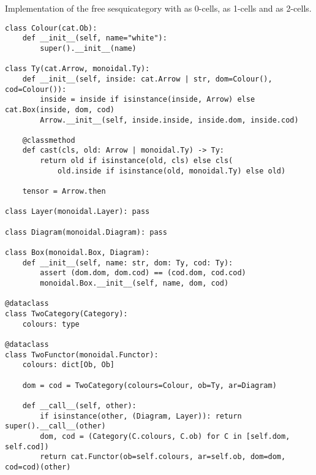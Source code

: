 \begin{python}\label{listing:free-sesquicategory}
{\normalfont Implementation of the free sesquicategory with  as 0-cells,  as 1-cells and  as 2-cells.}

\begin{verbatim}
class Colour(cat.Ob):
    def __init__(self, name="white"):
        super().__init__(name)

class Ty(cat.Arrow, monoidal.Ty):
    def __init__(self, inside: cat.Arrow | str, dom=Colour(), cod=Colour()):
        inside = inside if isinstance(inside, Arrow) else cat.Box(inside, dom, cod)
        Arrow.__init__(self, inside.inside, inside.dom, inside.cod)

    @classmethod
    def cast(cls, old: Arrow | monoidal.Ty) -> Ty:
        return old if isinstance(old, cls) else cls(
            old.inside if isinstance(old, monoidal.Ty) else old)

    tensor = Arrow.then

class Layer(monoidal.Layer): pass

class Diagram(monoidal.Diagram): pass

class Box(monoidal.Box, Diagram):
    def __init__(self, name: str, dom: Ty, cod: Ty):
        assert (dom.dom, dom.cod) == (cod.dom, cod.cod)
        monoidal.Box.__init__(self, name, dom, cod)

@dataclass
class TwoCategory(Category):
    colours: type

@dataclass
class TwoFunctor(monoidal.Functor):
    colours: dict[Ob, Ob]

    dom = cod = TwoCategory(colours=Colour, ob=Ty, ar=Diagram)

    def __call__(self, other):
        if isinstance(other, (Diagram, Layer)): return super().__call__(other)
        dom, cod = (Category(C.colours, C.ob) for C in [self.dom, self.cod])
        return cat.Functor(ob=self.colours, ar=self.ob, dom=dom, cod=cod)(other)
\end{verbatim}
\end{python}

